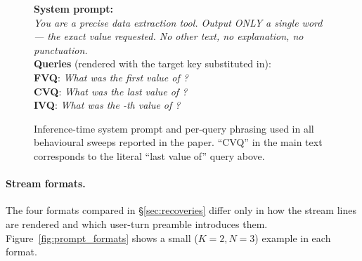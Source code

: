 \documentclass[11pt]{article}
\begin{document}
\begin{figure}[h]
\small
\centering
\begin{tcolorbox}[
    colframe=black!30, colback=gray!4,
    boxrule=0.5pt, arc=2pt,
    left=6pt, right=6pt, top=4pt, bottom=4pt,
    title={\textbf{System prompt and queries}},
    fonttitle=\small\bfseries,
    coltitle=black]
\textbf{System prompt:}\\[1pt]
\emph{You are a precise data extraction tool. Output ONLY a single
word --- the exact value requested. No other text, no explanation,
no punctuation.}\\[6pt]
\textbf{Queries} (rendered with the target key substituted in):\\[1pt]
\textbf{FVQ}: \emph{What was the first value of {\sc[target]}?}\\
\textbf{CVQ}: \emph{What was the last value of {\sc[target]}?}\\
\textbf{IVQ}: \emph{What was the {\sc[k]}-th value of
{\sc[target]}?}
\end{tcolorbox}
\caption{Inference-time system prompt and per-query phrasing used in
all behavioural sweeps reported in the paper. ``CVQ'' in the main
text corresponds to the literal ``last value of'' query above.}
\label{fig:prompt_system}
\end{figure}

\paragraph{Stream formats.}
The four formats compared in \S\ref{sec:recoveries} differ only in
how the stream lines are rendered and which user-turn preamble
introduces them. Figure~\ref{fig:prompt_formats} shows a small
($K{=}2, N{=}3$) example in each format.
\end{document}
